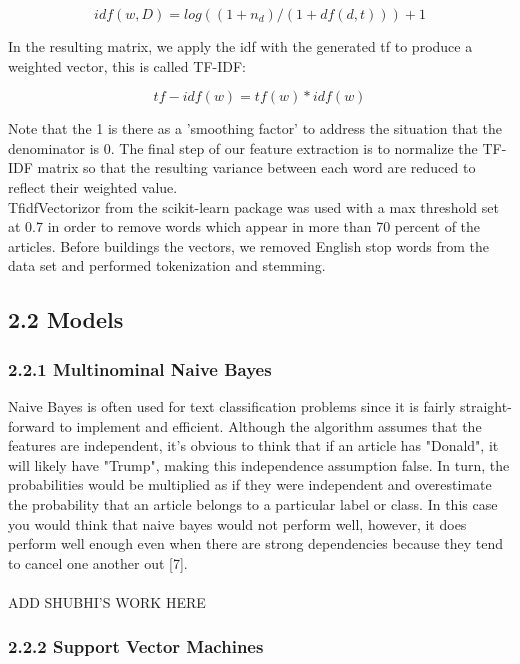 \documentclass{neu_handout}
\begin{document}
$$idf(w,D)=log((1+n_d)/(1+df(d,t)))+1$$

In the resulting matrix, we apply the idf with the generated tf to produce a weighted vector, this is called TF-IDF:

$$tf-idf(w)=tf(w)*idf(w)$$

Note that the 1 is there as a 'smoothing factor' to address the situation that the denominator is 0. The final step of our feature extraction is to normalize the TF-IDF matrix so that the resulting variance between each word are reduced to reflect their weighted value.\\

TfidfVectorizor from the scikit-learn package was used with a max threshold set at 0.7 in order to remove words which appear in more than 70 percent of the articles. Before buildings the vectors, we removed English stop words from the data set and performed tokenization and stemming.

\subsection*{2.2 Models}



\subsubsection*{2.2.1 Multinominal Naive Bayes}

Naive Bayes is often used for text classification problems since it is  fairly straight-forward to implement and efficient. Although the algorithm assumes that the features are independent, it's obvious to think that if an article has "Donald", it will likely have "Trump", making this independence assumption false. In turn, the probabilities would be multiplied as if they were independent and overestimate the probability that an article belongs to a particular label or class. In this case you would think that naive bayes would not perform well, however, it does perform well enough even when there are strong dependencies because they tend to cancel one another out [7].\\\\

ADD SHUBHI'S WORK HERE


\subsubsection*{2.2.2 Support Vector Machines}
\end{document}
